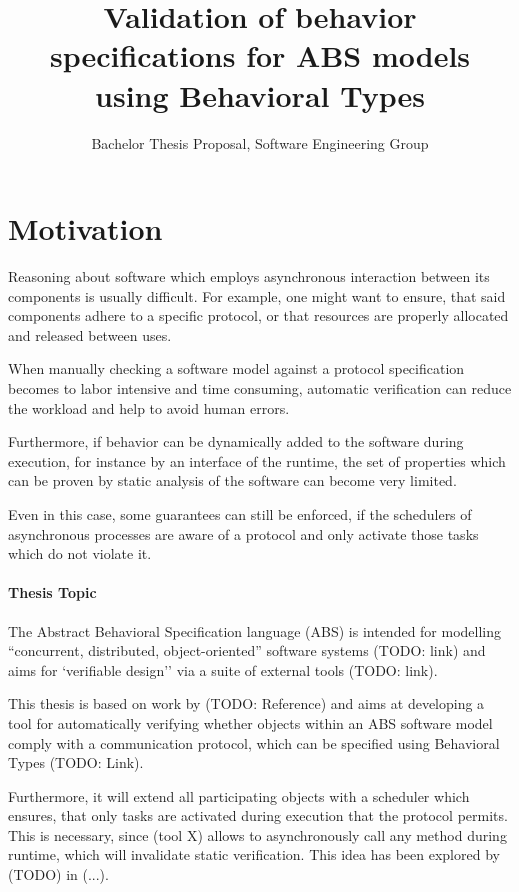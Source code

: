 \documentclass[paper=a4,nochapname,accentcolor=tud9c]{tudexercise}
\title{Validation of behavior specifications for ABS models using Behavioral Types}
\subtitle{Bachelor Thesis Proposal, Software Engineering Group}
\begin{document}
%
\maketitle
%
\tableofcontents

\section{Motivation}
Reasoning about software which employs asynchronous interaction between its
components is usually difficult.
For example, one might want to ensure, that said components adhere to a specific
protocol, or that resources are properly allocated and released between uses.

When manually checking a software model against a protocol specification becomes
to labor intensive and time consuming, automatic verification can reduce the
workload and help to avoid human errors.

Furthermore, if behavior can be dynamically added to the software during execution,
for instance by an interface of the runtime, the set of properties which
can be proven by static analysis of the software can become very limited.

Even in this case, some guarantees can still be enforced, if the schedulers of
asynchronous processes are aware of a protocol and only activate those tasks
which do not violate it.

\paragraph{Thesis Topic}

The Abstract Behavioral Specification language (ABS) is intended for modelling
``concurrent, distributed, object-oriented'' software systems (TODO: link) and
aims for `verifiable design'' via a suite of external tools (TODO: link).

This thesis is based on work by (TODO: Reference) and aims at developing a tool
for automatically verifying whether objects within an ABS software model comply
with a communication protocol, which can be specified using Behavioral Types
(TODO: Link).

Furthermore, it will extend all participating objects with a scheduler which
ensures, that only tasks are activated during execution that the protocol permits.
This is necessary, since (tool X) allows to asynchronously call any method during
runtime, which will invalidate static verification.
This idea has been explored by (TODO) in (...).
\end{document}
